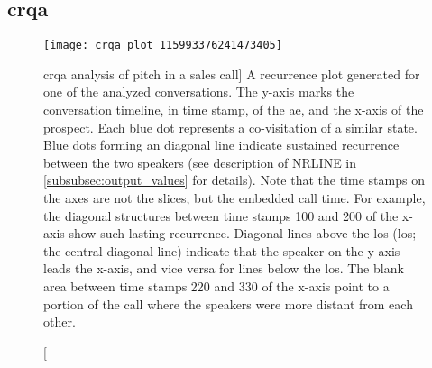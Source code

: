 
\subsection[\Acl{crqa} for measuring accommodation]{\Acl{crqa}}
\label{subsec:crqa}

\begin{figure}[t]
	\centering
	\texttt{[image: crqa\_plot\_115993376241473405]}
	\caption
	[\acs{crqa} analysis of pitch in a sales call]
	{A recurrence plot generated for one of the analyzed conversations.
		The y-axis marks the conversation timeline, in time stamp, of the \ac{ae}, and the x-axis of the prospect.
		Each blue dot represents a co-visitation of a similar state.
		Blue dots forming an diagonal line indicate sustained recurrence between the two speakers (see description of NRLINE in \cref{subsubsec:output_values} for details).
		Note that the time stamps on the axes are not the slices, but the embedded call time. 
		For example, the diagonal structures between time stamps 100 and 200 of the x-axis show such lasting recurrence.
		Diagonal lines above the \acl{los} (\acs{los}; the central diagonal line) indicate that the speaker on the y-axis leads the x-axis, and vice versa for lines below the \ac{los}.
		The blank area between time stamps 220 and 330 of the x-axis point to a portion of the call where the speakers were more distant from each other.}
	\label{fig:crqa_plot}
\end{figure}


